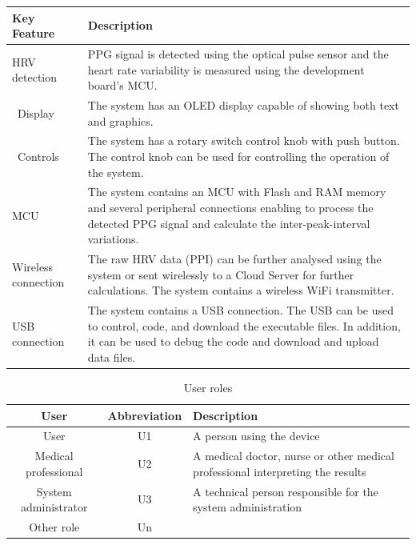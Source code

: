 \documentclass{article}
\begin{document}
\begin{table}
\begin{tabular}{|p{4cm}|p{7cm}|}
\hline
\textbf{Key Feature} & \textbf{Description} \\
\hline
HRV detection & PPG signal is detected using the optical pulse sensor and the heart rate variability is measured using the development board’s MCU. \\
\hline\
Display & The system has an OLED display capable of showing both text and graphics. \\
\hline\
Controls & The system has a rotary switch control knob with push button. The control knob can be used for controlling the operation of the system. \\
\hline
MCU & The system contains an MCU with Flash and RAM memory and several peripheral connections enabling to process the detected PPG signal and calculate the inter-peak-interval variations. \\
\hline
Wireless connection & The raw HRV data (PPI) can be further analysed using the system or sent wirelessly to a Cloud Server for further calculations. The system contains a wireless WiFi transmitter. \\
\hline
USB connection & The system contains a USB connection. The USB can be used to control, code, and download the executable files. In addition, it can be used to debug the code and download and upload data files. \\
\hline
\end{tabular}
\end{table}



\begin{table}[h]
\centering
\begin{tabular}{|c|c|p{4cm}|}
\hline
\textbf{User} & \textbf{Abbreviation} & \textbf{Description} \\
\hline
User & U1 & A person using the device \\
\hline
Medical professional & U2 & A medical doctor, nurse or other medical professional interpreting the results \\ \hline
System administrator & U3 & A technical person responsible for the system administration \\ \hline
Other role & Un & \\
\hline
\end{tabular}
\caption{User roles}
\label{tab:X3}
\end{table}
\end{document}
